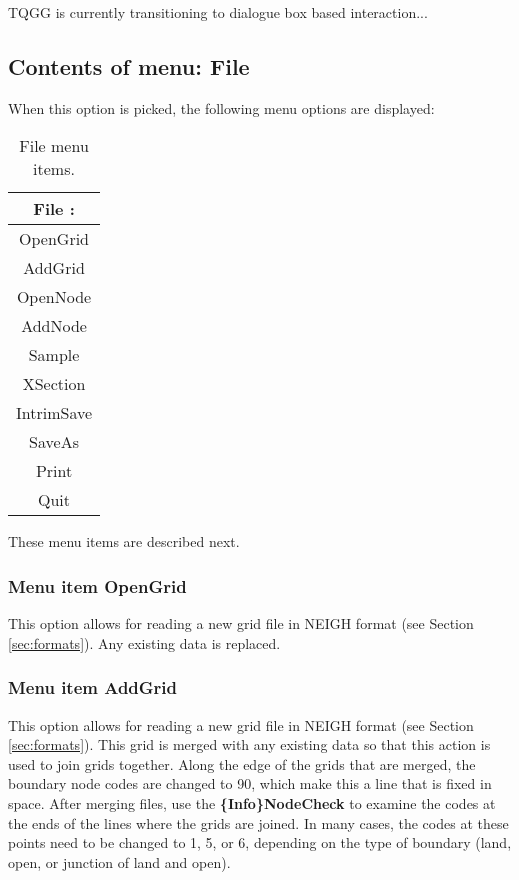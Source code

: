 \documentclass{article}
\begin{document}
TQGG is currently transitioning to dialogue box based interaction... 

\subsection{Contents of menu: File}
When this option is picked, the following menu options are displayed:

\begin{table}[htb!]
 \caption{File menu items.}
  \begin{center}
   \begin{tabular}{|c|}
    \hline
File :\\     \hline
OpenGrid \\ AddGrid \\ OpenNode \\ AddNode \\ Sample \\ XSection \\ IntrimSave \\ SaveAs \\ Print \\ Quit\\
    \hline
   \end{tabular}
   \label{tab:FILE}
  \end{center}
\end{table}

These menu items are described next.

\subsubsection[Menu item OpenGrid]{Menu item OpenGrid}
This option allows for reading a new grid file in NEIGH format (see Section \ref{sec:formats}). Any existing data is replaced.

\subsubsection[Menu item AddGrid]{Menu item AddGrid}
This option allows for reading a new grid file in NEIGH format (see Section \ref{sec:formats}). This grid is merged with any existing data so that this action is used to join grids together. Along the edge of the grids that are merged, the boundary node codes are changed to 90, which make this a line that is fixed in space. After merging files, use the \textbf{\{Info\}NodeCheck} to examine the codes at the ends of the lines where the grids are joined. In many cases, the codes at these points need to be changed to 1, 5, or 6, depending on the type of boundary (land, open, or junction of land and open).
\end{document}
